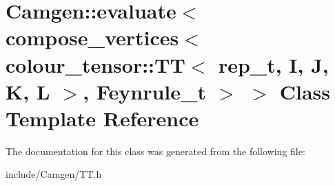 \hypertarget{a00173}{\section{Camgen\-:\-:evaluate$<$ compose\-\_\-vertices$<$ colour\-\_\-tensor\-:\-:T\-T$<$ rep\-\_\-t, I, J, K, L $>$, Feynrule\-\_\-t $>$ $>$ Class Template Reference}
\label{a00173}
}


The documentation for this class was generated from the following file\-:\begin{DoxyCompactItemize}
\item 
include/\-Camgen/T\-T.\-h\end{DoxyCompactItemize}
